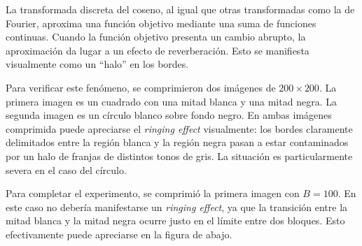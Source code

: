 \documentclass{article}
\begin{document}
La transformada discreta del coseno, al igual que otras transformadas
como la de Fourier, aproxima una función objetivo
mediante una suma de funciones continuas. 
Cuando la función objetivo presenta un cambio abrupto,
la aproximación da lugar a un efecto de
reverberación.
Esto se manifiesta visualmente como un ``halo'' en los bordes.

Para verificar este fenómeno, se comprimieron dos imágenes de
$200 \times 200$.
La primera imagen es un cuadrado con una mitad blanca y una
mitad negra.
La segunda imagen es un círculo blanco sobre fondo negro.
En ambas imágenes comprimida puede apreciarse el {\em ringing effect}
visualmente:
los bordes claramente delimitados entre la región blanca y la
región negra pasan a estar contaminados por un halo de
franjas de distintos tonos de gris.
La situación es particularmente severa en el caso del círculo.

Para completar el experimento, se comprimió la primera imagen
con $B = 100$.
En este caso no debería manifestarse un {\em ringing effect},
ya que la transición entre la mitad blanca y la mitad negra ocurre
justo en el límite entre dos bloques.
Esto efectivamente puede apreciarse en la figura de abajo.
\end{document}
